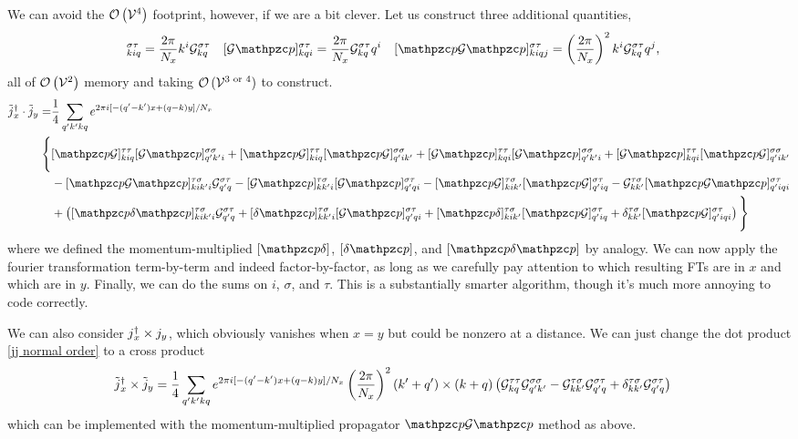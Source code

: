 We can avoid the $\mathcal{O}\left(\mathcal{V}^4\right)$ footprint, however, if we are a bit clever.
Let us construct three additional quantities,
\begin{align}
	[\p\G]^{\sigma\tau}_{kiq} &= \frac{2\pi}{N_x} k^i \G^{\sigma\tau}_{kq}
	&
	[\G \p]^{\sigma\tau}_{kqi} &= \frac{2\pi}{N_x} \G^{\sigma\tau}_{kq} q^i
	&
	[\p\G \p]^{\sigma\tau}_{kiqj} &= \left(\frac{2\pi}{N_x}\right)^2 k^i \G^{\sigma\tau}_{kq} q^j,
\end{align}
all of $\mathcal{O}\left(\mathcal{V}^2\right)$ memory and taking $\mathcal{O}\left(\mathcal{V}^{\text{3 or 4}}\right)$ to construct.
\begin{align}
	\tilde{j}\adjoint_x \cdot \tilde{j}_y
	=&
	\oneover{4}\sum_{q'k'kq} e^{2\pi i[ -(q'-k')x + (q-k) y]/N_x}
	\nonumber\\
	\Bigg\{&
		[\p\G]^{\tau\tau}_{kiq} [\G\p]^{\sigma\sigma}_{q'k'i}
	+	[\p\G]^{\tau\tau}_{kiq} [\p\G]^{\sigma\sigma}_{q'ik'}
	+	[\G\p]^{\tau\tau}_{kqi} [\G\p]^{\sigma\sigma}_{q'k'i}
	+	[\G\p]^{\tau\tau}_{kqi} [\p\G]^{\sigma\sigma}_{q'ik'}
	\nonumber\\
	&
	-	[\p\G\p]^{\tau\sigma}_{kik'i} \G^{\sigma\tau}_{q'q}
	-	[\G\p]^{\tau\sigma}_{kk'i} [\G\p]^{\sigma\tau}_{q'qi}
	-	[\p\G]^{\tau\sigma}_{kik'} [\p\G]^{\sigma\tau}_{q'iq}
	-	\G^{\tau\sigma}_{kk'} [\p\G\p]^{\sigma\tau}_{q'iqi}
	\nonumber\\
	&
	+\left(
		[\p\delta\p]^{\tau\sigma}_{kik'i} \G^{\sigma\tau}_{q'q}
	+	[\delta\p]^{\tau\sigma}_{kk'i} [\G\p]^{\sigma\tau}_{q'qi}
	+	[\p\delta]^{\tau\sigma}_{kik'} [\p\G]^{\sigma\tau}_{q'iq}
	+	\delta^{\tau\sigma}_{kk'} [\p\G]^{\sigma\tau}_{q'iqi}
	\right)
	\Bigg\}
\end{align}
where we defined the momentum-multiplied $[\p\delta]$, $[\delta\p]$, and $[\p\delta\p]$ by analogy.
We can now apply the fourier transformation term-by-term and indeed factor-by-factor, as long as we carefully pay attention to which resulting FTs are in $x$ and which are in $y$.
Finally, we can do the sums on $i$, $\sigma$, and $\tau$.
This is a substantially smarter algorithm, though it's much more annoying to code correctly.

We can also consider $j{}^{\dagger}_x \times j_y$, which obviously vanishes when $x=y$ but could be nonzero at a distance.
We can just change the dot product \eqref{jj normal order} to a cross product
\begin{align}
	\tilde{j}{}^{\dagger}_x \times \tilde{j}_y
	&=
	\frac{1}{4}\sum_{q'k'kq} e^{2\pi i[ -(q'-k')x + (q-k) y]/N_x} \left(\frac{2\pi}{N_x}\right)^2 (k'+q')\times(k+q)
	\left(\mathcal{G}^{\tau\tau}_{kq}\mathcal{G}^{\sigma\sigma}_{q'k'} - \mathcal{G}^{\tau\sigma}_{kk'} \mathcal{G}^{\sigma\tau}_{q'q} + \delta^{\tau\sigma}_{kk'} \mathcal{G}^{\sigma\tau}_{q'q}\right)
\end{align}
which can be implemented with the momentum-multiplied propagator $\p\G\p$ method as above.
